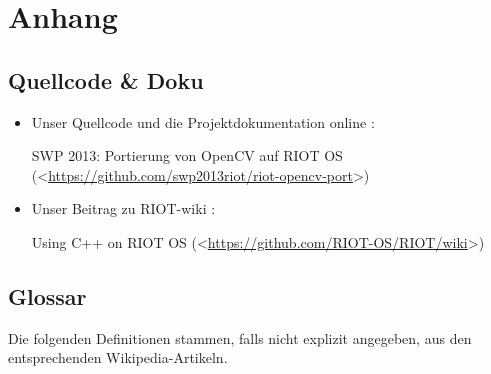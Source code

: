 \documentclass[10pt,a4paper]{article}
\begin{document}
\newpage
\section{Anhang}

\subsection{Quellcode \& Doku}

\begin {itemize}

\item Unser Quellcode und die Projektdokumentation online : 

SWP 2013: Portierung von OpenCV auf RIOT OS \newline (\textless\href{https://github.com/swp2013riot/riot-opencv-port}{https://github.com/swp2013riot/riot-opencv-port}\textgreater) 

\item Unser Beitrag zu RIOT-wiki : 

Using C++ on RIOT OS \newline 
(\textless\href{https://github.com/RIOT-OS/RIOT/wiki}{https://github.com/RIOT-OS/RIOT/wiki}\textgreater)

\end {itemize}

\subsection{Glossar}

Die folgenden Definitionen stammen, falls nicht explizit angegeben, aus den entsprechenden Wikipedia-Artikeln.
\end{document}
